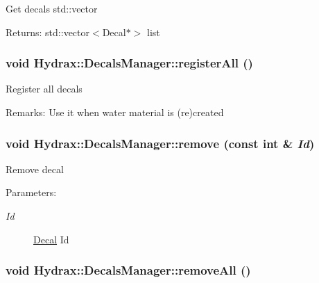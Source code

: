 Get decals std::vector \begin{Desc}
\item[Returns:]std::vector$<$Decal$\ast$$>$ list \end{Desc}
\hypertarget{class_hydrax_1_1_decals_manager_a96b53445a99ef4eb3741532e4a05935}{
\subsubsection[{registerAll}]{\setlength{\rightskip}{0pt plus 5cm}void Hydrax::DecalsManager::registerAll ()}}
\label{class_hydrax_1_1_decals_manager_a96b53445a99ef4eb3741532e4a05935}


Register all decals \begin{Desc}
\item[Remarks:]Use it when water material is (re)created \end{Desc}
\hypertarget{class_hydrax_1_1_decals_manager_0fe39817d916ec61f18233fbf4525cfa}{
\subsubsection[{remove}]{\setlength{\rightskip}{0pt plus 5cm}void Hydrax::DecalsManager::remove (const int \& {\em Id})}}
\label{class_hydrax_1_1_decals_manager_0fe39817d916ec61f18233fbf4525cfa}


Remove decal \begin{Desc}
\item[Parameters:]
\begin{description}
\item[{\em Id}]\hyperlink{class_hydrax_1_1_decal}{Decal} Id \end{description}
\end{Desc}
\hypertarget{class_hydrax_1_1_decals_manager_9b32ab656bcf592929b2c10d25e2416b}{
\subsubsection[{removeAll}]{\setlength{\rightskip}{0pt plus 5cm}void Hydrax::DecalsManager::removeAll ()}}
\label{class_hydrax_1_1_decals_manager_9b32ab656bcf592929b2c10d25e2416b}


